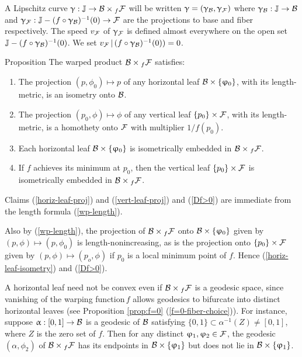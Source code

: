 


A Lipschitz curve $\gamma:\JJ\to \spc{B}\times_f\spc{\spc{F}}$ will be written $\upgamma=(\upgamma_{\mathcal{B}},\upgamma_{\mathcal{\mathcal{F}}})$ where $\gamma_\spc{B}:\JJ\to \spc{B}$ and $\gamma_\spc{F}:\JJ-(f\circ\gamma_\spc{B})^{-1}(0)\to \spc{F}$ are the projections to base and fiber respectively. The speed $v_{\mathcal{F}}$ of $\upgamma_{\mathcal{F}}$ is defined almost everywhere on the open set $\JJ-(f\circ\gamma_\spc{B})^{-1}(0)$.  We set $ v_\spc{F}\,|\,(f\circ\gamma_\spc{B})^{-1}(0))=0$.



\begin{thm}{Proposition}
The warped product $\spc{\spc{B}}\times_f\spc{F}$ satisfies:
\begin{enumerate}

\item\label{horiz-leaf-proj}
The projection $(p,\phi_0)\mapsto p$  of any  horizontal leaf $\spc{B}\times\{\phi_0\}$, with its length-metric,  is an isometry onto $\mathcal{B}$.

\item\label{vert-leaf-proj}
The projection $(p_0,\phi)\mapsto \phi$ of any  vertical leaf $\{p_0\}\times \spc{F}$, with its length-metric,  is a homothety onto $\mathcal{F}$ with multiplier $1/f(p_0)$.

\item\label{horiz-leaf-isometry}
Each horizontal leaf $\spc{B}\times\{\phi_0\}$ is isometrically embedded in $\spc{B}\times_f\spc{F}$.

\item\label{Df>0}
If  $f$ achieves its minimum at $p_0$, then the vertical leaf
$\{p_0\} \times \spc{F}$ is isometrically embedded in $\spc{B}\times_f\spc{F}$.
\end{enumerate}

\end{thm}


Claims  (\ref{horiz-leaf-proj}) and (\ref{vert-leaf-proj}) and (\ref{Df>0})  are immediate from the 
length formula (\ref{wp-length}).

Also by (\ref{wp-length}), the projection of
$\spc{B}\times_f\spc{F}$ onto $\spc{B}\times\{\phi_0\}$ given by  $(p,\phi)\mapsto (p,\phi_0)$   is length-nonincreasing, as is the projection onto $\{p_0\} \times \spc{F}$ given by  $(p,\phi)\mapsto (p_o,\phi)$  if $p_0$ is a local minimum point of $f$.  
Hence (\ref{horiz-leaf-isometry}) and (\ref{Df>0}).
\qeds


A horizontal leaf need not be convex even if $\spc{B}\times_f\spc{F}$ is a geodesic space, since vanishing of the warping function$\,f$ allows geodesics to bifurcate into distinct horizontal leaves (see Proposition \ref{prop:f=0} (\ref{f=0-fiber-choice})).  For instance, suppose $\alpha:[0,1]\to \spc{B}$ is a geodesic of $\mathcal{B}$ satisfying $\{0,1\}\subset\alpha^{-1}(Z)\neq[0,1]$, where $Z$ is the zero set of $f$. Then for any distinct $\phi_1, \phi_2 \in \spc{F}$, the geodesic $(\alpha,\phi_2)$ of  $\spc{B} \times_f\spc{F}$ has its endpoints in $\spc{B}\times\{\phi_1\}$ but does not lie in $\spc{B}\times\{\phi_1\}$.


